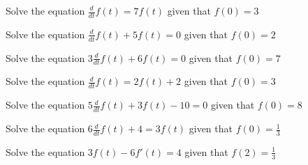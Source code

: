 

\begin{enumerate}

\qitem Solve the equation $\frac{d}{dt} f(t) = 7 f(t) $ given that $f(0) = 3$


\qitem Solve the equation $\frac{d}{dt} f(t) + 5 f(t) = 0 $ given that $f(0) = 2$


\qitem Solve the equation $3 \frac{d}{dt} f(t) + 6 f(t) = 0$ given that $f(0) = 7$


\qitem Solve the equation $\frac{d}{dt} f(t) = 2f(t) + 2 $ given that $f(0) = 3$



\qitem Solve the equation $5\frac{d}{dt} f(t) + 3f(t) - 10 = 0 $ given that $f(0) = 8$




\qitem Solve the equation $6\frac{d}{dt} f(t) + 4 = 3f(t) $ given that $f(0) = \frac{1}{3}$



\qitem Solve the equation $3f(t) - 6 f'(t) = 4$ given that $f(2) = \frac{1}{3}$

\sol{

}
\end{enumerate}
